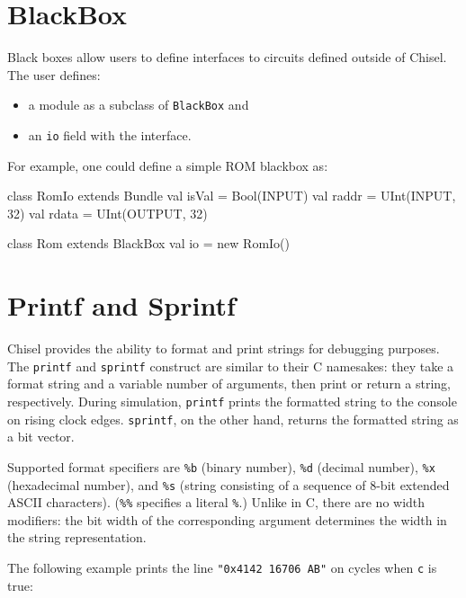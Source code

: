 \documentclass[10pt,twocolumn]{article}
\def\code#1{{\small\tt #1}}
\begin{document}

\section{BlackBox}

Black boxes allow users to define interfaces to circuits defined
outside of Chisel.  The user defines:

\begin{itemize}
\item a module as a subclass of \code{BlackBox} and
\item an \code{io} field with the interface.
\end{itemize}

\noindent
For example, one could define a simple ROM blackbox as:

\begin{scala}
class RomIo extends Bundle {
  val isVal = Bool(INPUT)
  val raddr = UInt(INPUT,  32)
  val rdata = UInt(OUTPUT, 32)
}

class Rom extends BlackBox {
  val io = new RomIo()
}
\end{scala}

\section{Printf and Sprintf}

Chisel provides the ability to format and print strings for debugging
purposes.  The \code{printf} and \code{sprintf} construct are similar to their
C namesakes: they take a format string and a variable number of arguments,
then print or return a string, respectively.  During simulation, \code{printf}
prints the formatted string to the console on rising clock edges.
\code{sprintf}, on the other hand, returns the formatted string as a bit
vector.

Supported format specifiers are \code{\%b} (binary number), \code{\%d}
(decimal number), \code{\%x} (hexadecimal number), and \code{\%s} (string
consisting of a sequence of 8-bit extended ASCII characters).  (\code{\%\%}
specifies a literal \code{\%}.) Unlike in C, there are no width modifiers: the
bit width of the corresponding argument determines the width in the string
representation.

The following example prints the line \code{"0x4142 16706 AB"} on cycles when
\code{c} is true:

\end{document}

